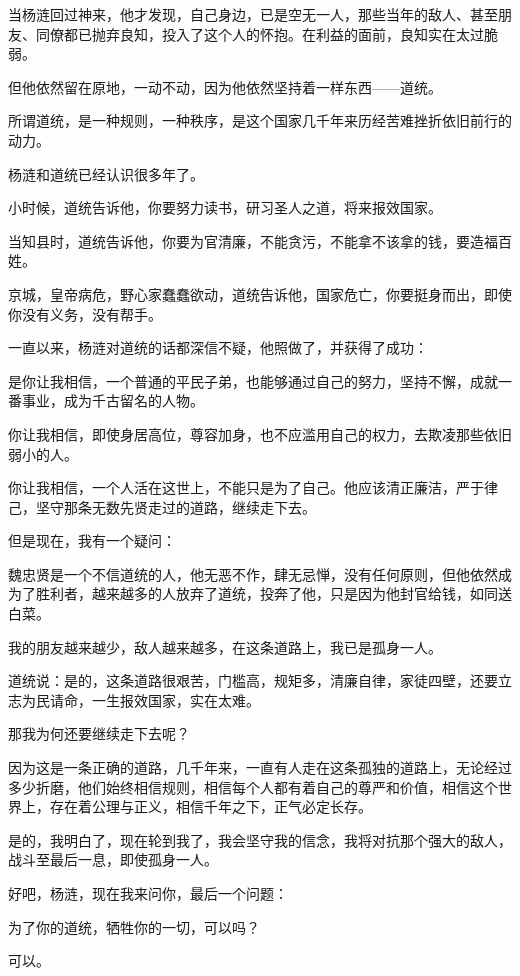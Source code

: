 \begin{multicols}{\theparacolNo}
当杨涟回过神来，他才发现，自己身边，已是空无一人，那些当年的敌人、甚至朋友、同僚都已抛弃良知，投入了这个人的怀抱。在利益的面前，良知实在太过脆弱。

但他依然留在原地，一动不动，因为他依然坚持着一样东西——道统。

所谓道统，是一种规则，一种秩序，是这个国家几千年来历经苦难挫折依旧前行的动力。

杨涟和道统已经认识很多年了。

小时候，道统告诉他，你要努力读书，研习圣人之道，将来报效国家。

当知县时，道统告诉他，你要为官清廉，不能贪污，不能拿不该拿的钱，要造福百姓。

京城，皇帝病危，野心家蠢蠢欲动，道统告诉他，国家危亡，你要挺身而出，即使你没有义务，没有帮手。

一直以来，杨涟对道统的话都深信不疑，他照做了，并获得了成功：

是你让我相信，一个普通的平民子弟，也能够通过自己的努力，坚持不懈，成就一番事业，成为千古留名的人物。

你让我相信，即使身居高位，尊容加身，也不应滥用自己的权力，去欺凌那些依旧弱小的人。

你让我相信，一个人活在这世上，不能只是为了自己。他应该清正廉洁，严于律己，坚守那条无数先贤走过的道路，继续走下去。

但是现在，我有一个疑问：

魏忠贤是一个不信道统的人，他无恶不作，肆无忌惮，没有任何原则，但他依然成为了胜利者，越来越多的人放弃了道统，投奔了他，只是因为他封官给钱，如同送白菜。

我的朋友越来越少，敌人越来越多，在这条道路上，我已是孤身一人。

道统说：是的，这条道路很艰苦，门槛高，规矩多，清廉自律，家徒四壁，还要立志为民请命，一生报效国家，实在太难。

那我为何还要继续走下去呢？

因为这是一条正确的道路，几千年来，一直有人走在这条孤独的道路上，无论经过多少折磨，他们始终相信规则，相信每个人都有着自己的尊严和价值，相信这个世界上，存在着公理与正义，相信千年之下，正气必定长存。

是的，我明白了，现在轮到我了，我会坚守我的信念，我将对抗那个强大的敌人，战斗至最后一息，即使孤身一人。

好吧，杨涟，现在我来问你，最后一个问题：

为了你的道统，牺牲你的一切，可以吗？

可以。

\ifnum{}
	\end{multicols}
\fi
\newpage
